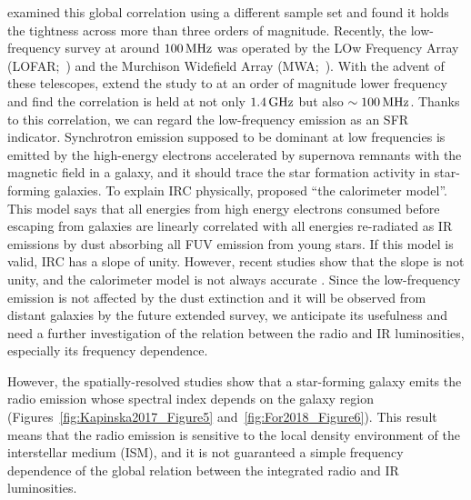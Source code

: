 \citet{Condon1991a,Yun2001a, Bell2003} examined this global correlation using a different sample set and found it holds the tightness across more than three orders of magnitude.
Recently, the low-frequency survey at around $100\,\mathrm{MHz}$ was operated by the LOw Frequency Array (LOFAR;~\citealt{VanHaarlem2013}) and the Murchison Widefield Array (MWA;~\citealt{Tingay2013a}).
With the advent of these telescopes, \citet{CalistroRivera2017a, Read2018, Wang2019} extend the study to at an order of magnitude lower frequency and find the correlation is held at not only $1.4\,\mathrm{GHz}$ but also $\sim 100\,\mathrm{MHz}$.
Thanks to this correlation, we can regard the low-frequency emission as an SFR indicator.
Synchrotron emission supposed to be dominant at low frequencies is emitted by the high-energy electrons accelerated by supernova remnants with the magnetic field in a galaxy, and it should trace the star formation activity in star-forming galaxies.
To explain IRC physically, \citet{Volk1989} proposed ``the calorimeter model''.
This model says that all energies from high energy electrons consumed before escaping from galaxies are linearly correlated with all energies re-radiated as IR emissions by dust absorbing all FUV emission from young stars.
If this model is valid, IRC has a slope of unity.
However, recent studies show that the slope is not unity, and the calorimeter model is not always accurate \citep{CalistroRivera2017a, Read2018}.
Since the low-frequency emission is not affected by the dust extinction \citep{Yun2001a, Murphy2011} and it will be observed from distant galaxies by the future extended survey, we anticipate its usefulness and need a further investigation of the relation between the radio and IR luminosities, especially its frequency dependence.

However, the spatially-resolved studies show that a star-forming galaxy emits the radio emission whose spectral index depends on the galaxy region \citep{Kapinska2017a, For2018a, Heesen2019} (Figures~\ref{fig:Kapinska2017_Figure5} and~\ref{fig:For2018_Figure6}).
This result means that the radio emission is sensitive to the local density environment of the interstellar medium (ISM), and it is not guaranteed a simple frequency dependence of the global relation between the integrated radio and IR luminosities.

